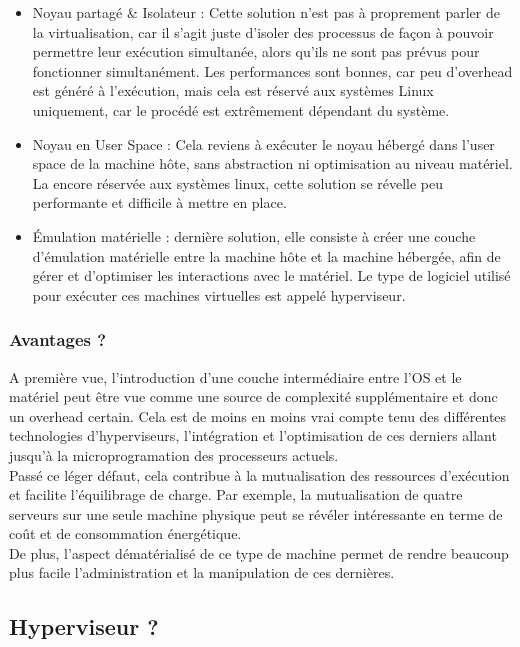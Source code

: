 \begin{itemize}
\item Noyau partagé \& Isolateur : Cette solution n'est pas à proprement parler de la virtualisation, car il s'agit juste d'isoler des processus de façon à pouvoir permettre leur exécution simultanée, alors qu'ils ne sont pas prévus pour fonctionner simultanément. Les performances sont bonnes, car peu d'overhead est généré à l'exécution, mais cela est réservé aux systèmes Linux uniquement, car le procédé est extrêmement dépendant du système.
\item Noyau en User Space : Cela reviens à exécuter le noyau hébergé dans l'user space de la machine hôte, sans abstraction ni optimisation au niveau matériel. La encore réservée aux systèmes linux, cette solution se révelle peu performante et difficile à mettre en place.
\item Émulation matérielle  : dernière solution, elle consiste à créer une couche d'émulation matérielle entre la machine hôte et la machine hébergée, afin de gérer et d'optimiser les interactions avec le matériel. Le type de logiciel utilisé pour exécuter ces machines virtuelles est appelé hyperviseur.
\end{itemize}

\subsubsection{Avantages ?}

A première vue, l'introduction d'une couche intermédiaire entre l'OS et le matériel peut être vue comme une source de complexité supplémentaire et donc un overhead certain. Cela est de moins en moins vrai compte tenu des différentes technologies d'hyperviseurs, l'intégration et l'optimisation de ces derniers allant jusqu'à la microprogramation des processeurs actuels.\\
Passé ce léger défaut, cela contribue à la mutualisation des ressources d'exécution et facilite l'équilibrage de charge. Par exemple, la mutualisation de quatre serveurs sur une seule machine physique peut se révéler intéressante en terme de coût et de consommation énergétique.\\
De plus, l'aspect dématérialisé de ce type de machine permet de rendre beaucoup plus facile l'administration et la manipulation de ces dernières.

\subsection{Hyperviseur ?}

